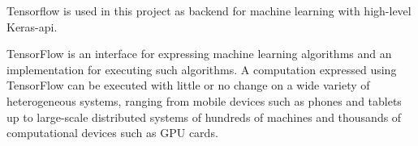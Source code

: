 \documentclass[../ImageClassifier.tex]{subfiles}
\begin{document}
    Tensorflow is used in this project as backend for machine learning with high-level Keras-\ac{api}. \parencite{tensorflow2015-whitepaper}
    \begin{quoting}[begintext={``}, endtext={''\parencite{tensorflow2015-whitepaper}}]
        TensorFlow is an interface for expressing machine learning algorithms and an implementation for executing such algorithms.
        A computation expressed using TensorFlow can be executed with little or no change on a wide variety of heterogeneous systems, ranging from mobile devices such as phones and tablets up to large-scale distributed systems of hundreds of machines and thousands of computational devices such as GPU cards.
    \end{quoting}
\end{document}
